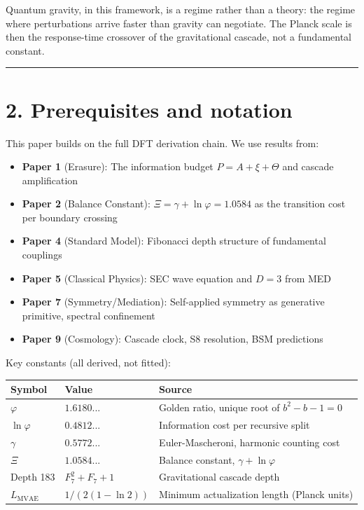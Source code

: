\documentclass[11pt,a4paper]{article}
\providecommand{\tightlist}{\setlength{\itemsep}{0pt}\setlength{\parskip}{0pt}}
\begin{document}
Quantum gravity, in this framework, is a regime rather than a theory: the regime where perturbations arrive faster than gravity can negotiate. The Planck scale is then the response-time crossover of the gravitational cascade, not a fundamental constant.

\begin{center}\rule{0.5\linewidth}{0.4pt}\end{center}

\section*{2. Prerequisites and notation}

This paper builds on the full DFT derivation chain. We use results from:

\begin{itemize}\tightlist
\item \textbf{Paper 1} (Erasure): The information budget $P = A + \xi + \Theta$ and cascade amplification
\item \textbf{Paper 2} (Balance Constant): $\Xi = \gamma + \ln\varphi = 1.0584$ as the transition cost per boundary crossing
\item \textbf{Paper 4} (Standard Model): Fibonacci depth structure of fundamental couplings
\item \textbf{Paper 5} (Classical Physics): SEC wave equation and $D = 3$ from MED
\item \textbf{Paper 7} (Symmetry/Mediation): Self-applied symmetry as generative primitive, spectral confinement
\item \textbf{Paper 9} (Cosmology): Cascade clock, S8 resolution, BSM predictions
\end{itemize}

Key constants (all derived, not fitted):

\begin{longtable}[]{@{}lll@{}}
\toprule
Symbol & Value & Source \\
\midrule\endhead
$\varphi$ & $1.6180...$ & Golden ratio, unique root of $b^2 - b - 1 = 0$ \\
$\ln\varphi$ & $0.4812...$ & Information cost per recursive split \\
$\gamma$ & $0.5772...$ & Euler-Mascheroni, harmonic counting cost \\
$\Xi$ & $1.0584...$ & Balance constant, $\gamma + \ln\varphi$ \\
Depth 183 & $F_7^2 + F_7 + 1$ & Gravitational cascade depth \\
$L_{\text{MVAE}}$ & $1/(2(1-\ln 2))$ & Minimum actualization length (Planck units) \\
\bottomrule
\end{longtable}
\end{document}
